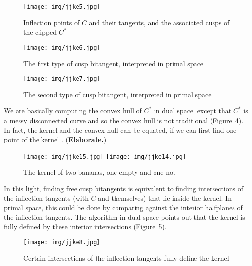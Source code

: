 \documentclass[12pt]{article}
\begin{document}
\begin{figure}
\begin{center}
\texttt{[image: img/jjke5.jpg]}
\end{center}
\caption{Inflection points of $C$ and their tangents, and the associated cusps of the clipped $C^*$}
\label{fig:infl}
\end{figure}

\begin{figure}
\begin{center}
\texttt{[image: img/jjke6.jpg]}
\end{center}
\caption{The first type of cusp bitangent, interpreted in primal space}
\label{fig:comp1}
\end{figure}

\begin{figure}
\begin{center}
\texttt{[image: img/jjke7.jpg]}
\end{center}
\caption{The second type of cusp bitangent, interpreted in primal space}
\label{fig:comp2}
\end{figure}

We are basically computing the convex hull of $C^*$ in dual space,
except that $C^*$ is a messy disconnected curve and so the convex hull
is not traditional (Figure~\ref{fig:banana}).
In fact, the kernel and the convex hull can be equated,
if we can first find one point of the kernel \cite{wang02}.
({\bf Elaborate.})

\begin{figure}
\begin{center}
\texttt{[image: img/jjke15.jpg]}
\texttt{[image: img/jjke14.jpg]}
\end{center}
\caption{The kernel of two bananas, one empty and one not}
\label{fig:banana}
\end{figure}

In this light, finding free cusp bitangents is equivalent
to finding intersections of the inflection tangents (with $C$ and themselves)
that lie inside the kernel.
In primal space, this could be done by comparing against the
interior halfplanes of the inflection tangents.
The algorithm in dual space points out that the kernel is fully defined
by these interior intersections (Figure~\ref{fig:free}).

\begin{figure}
\begin{center}
\texttt{[image: img/jjke8.jpg]}
\end{center}
\caption{Certain intersections of the inflection tangents fully define the kernel}
\label{fig:free}
\end{figure}
\end{document}
